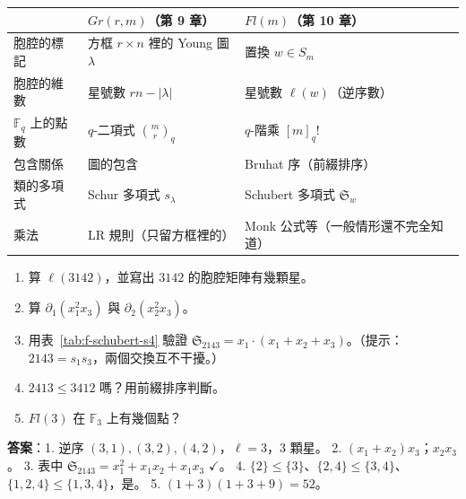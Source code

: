 \begin{keybox}[第 9、10 章對照]
\begin{tabular}{@{}lll@{}}
 & $Gr(r,m)$（第 9 章） & $Fl(m)$（第 10 章）\\ \midrule
胞腔的標記 & 方框 $r\times n$ 裡的 Young 圖 $\lambda$ & 置換 $w\in S_m$\\
胞腔的維數 & 星號數 $rn-|\lambda|$ & 星號數 $\ell(w)$（逆序數）\\
$\mathbb F_q$ 上的點數 & $q$-二項式 $\binom mr_q$ & $q$-階乘 $[m]_q!$\\
包含關係 & 圖的包含 & Bruhat 序（前綴排序）\\
類的多項式 & Schur 多項式 $s_\lambda$ & Schubert 多項式 $\mathfrak S_w$\\
乘法 & LR 規則（只留方框裡的） & Monk 公式等（一般情形還不完全知道）\\
\end{tabular}
\end{keybox}

\begin{notebox}[練習（答案在後面）]
\begin{enumerate}[nosep]
\item 算 $\ell(3142)$，並寫出 $3142$ 的胞腔矩陣有幾顆星。
\item 算 $\partial_1(x_1^2x_3)$ 與 $\partial_2(x_2^2x_3)$。
\item 用表~\ref{tab:f-schubert-s4} 驗證 $\mathfrak S_{2143}=x_1\cdot(x_1+x_2+x_3)$。（提示：$2143=s_1s_3$，兩個交換互不干擾。）
\item $2413\le3412$ 嗎？用前綴排序判斷。
\item $Fl(3)$ 在 $\mathbb F_3$ 上有幾個點？
\end{enumerate}
\textbf{答案}：1. 逆序 $(3,1),(3,2),(4,2)$，$\ell=3$，3 顆星。
2. $(x_1+x_2)x_3$；$x_2x_3$。
3. 表中 $\mathfrak S_{2143}=x_1^2+x_1x_2+x_1x_3$ $\checkmark$。
4. $\{2\}\le\{3\}$、$\{2,4\}\le\{3,4\}$、$\{1,2,4\}\le\{1,3,4\}$，是。
5. $(1+3)(1+3+9)=52$。
\end{notebox}
